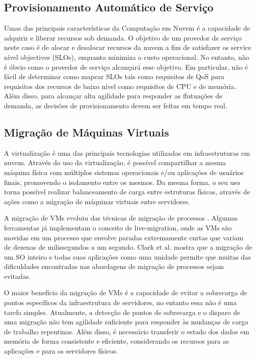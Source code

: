 	\subsection{Provisionamento Automático de Serviço}
	Umas das principais características da Computação em Nuvem é a capacidade de adquirir e liberar recursos sob demanda. O objetivo de um provedor de serviço neste caso é de alocar e desalocar recursos da nuvem a fim de satisfazer os service nível objectives (SLOs), enquanto minimiza o custo operacional.  No entanto, não é óbvio como o provedor de serviço alcançará esse objetivo. Em particular, não é fácil de determinar como mapear SLOs tais como requisitos de QoS para requisitos dos recursos de baixo nível como requisitos de CPU e de memória. Além disso, para alcançar alta agilidade para responder as flutuações de demanda, as decisões de provisionamento devem ser feitas em tempo real.
	
	\subsection{Migração de Máquinas Virtuais}
	A virtualização é uma das principais tecnologias utilizadas em infraestruturas em nuvem. Através do uso da virtualização, é possível compartilhar a mesma máquina física com múltiplos sistemas operacionais e/ou aplicações de usuários finais, promovendo o isolamento entre os mesmos. Da mesma forma, o seu uso torna possível realizar balanceamento de carga entre estruturas físicas, através de ações como a migração de máquinas virtuais entre servidores.
	
	A migração de VMs evoluiu das técnicas de migração de processos \cite{Osman:2002}. Algumas ferramentas já implementam o conceito de live-migration, onde as VMs são movidas em um processo que envolve paradas extremamente curtas que variam de dezenas de milissegundos a um segundo. Clark et al. \cite{Clark:2005} mostra que a migração de um SO inteiro e todas suas aplicações como uma unidade permite que muitas das dificuldades encontradas nas abordagens de migração de processos sejam evitadas.
	 
	O maior benefício da migração de VMs é a capacidade de evitar a sobrecarga de pontos específicos da infraestrutura de servidores, no entanto essa não é uma tarefa simples. Atualmente, a detecção de pontos de sobrecarga e o disparo de uma migração não tem agilidade suficiente para responder às mudanças de carga de trabalho repentinas. Além disso, é necessário transferir o estado dos dados em memória de forma consistente e eficiente, considerando os recursos para as aplicações e para os servidores físicos. 
	
